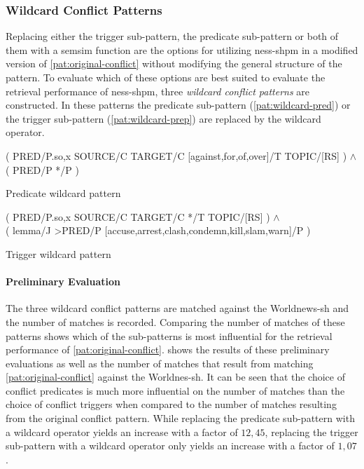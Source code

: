 \documentclass[11pt]{scrreprt}
\begin{document}
{\subsubsection{Wildcard Conflict Patterns}
\label{sec:wildcard-conflict-patterns}
Replacing either the trigger sub-pattern, the predicate sub-pattern or both of them with a semsim function are the options for utilizing \gls{ness-shpm} in a modified version of \cref{pat:original-conflict} without modifying the general structure of the pattern. To evaluate which of these options are best suited to evaluate the retrieval performance of \gls{ness-shpm}, three \textit{wildcard conflict patterns} are constructed. In these patterns the predicate sub-pattern (\cref{pat:wildcard-pred}) or the trigger sub-pattern (\cref{pat:wildcard-prep}) are replaced by the wildcard operator. 

\begin{pattern}
  \normalfont\sffamily
  \centering
  ( PRED/P.{so,x} SOURCE/C TARGET/C [against,for,of,over]/T TOPIC/[RS] ) \(\wedge\) \\ ( PRED/P */P )
  \caption{Predicate wildcard pattern}
  \label{pat:wildcard-pred}
\end{pattern}

\begin{pattern}
  \normalfont\sffamily
  \centering
  ( PRED/P.{so,x} SOURCE/C TARGET/C */T TOPIC/[RS] ) \(\wedge\) \\  ( lemma/J >PRED/P [accuse,arrest,clash,condemn,kill,slam,warn]/P )
  \caption{Trigger wildcard pattern}
  \label{pat:wildcard-prep}
\end{pattern}


\paragraph{Preliminary Evaluation}
The three wildcard conflict patterns are matched against the Worldnews-\gls{sh} and the number of matches is recorded. Comparing the number of matches of these patterns shows which of the sub-patterns is most influential for the retrieval performance of \cref{pat:original-conflict}.  shows the results of these preliminary evaluations as well as the number of matches that result from matching \cref{pat:original-conflict} against the Worldnes-\gls{sh}. It can be seen that the choice of conflict predicates is much more influential on the number of matches than the choice of conflict triggers when compared to the number of matches resulting from the original conflict pattern. While replacing the predicate sub-pattern with a wildcard operator yields an increase with a factor of \(12,45\), replacing the trigger sub-pattern with a wildcard operator only yields an increase with a factor of \(1,07\). 


}
\end{document}
